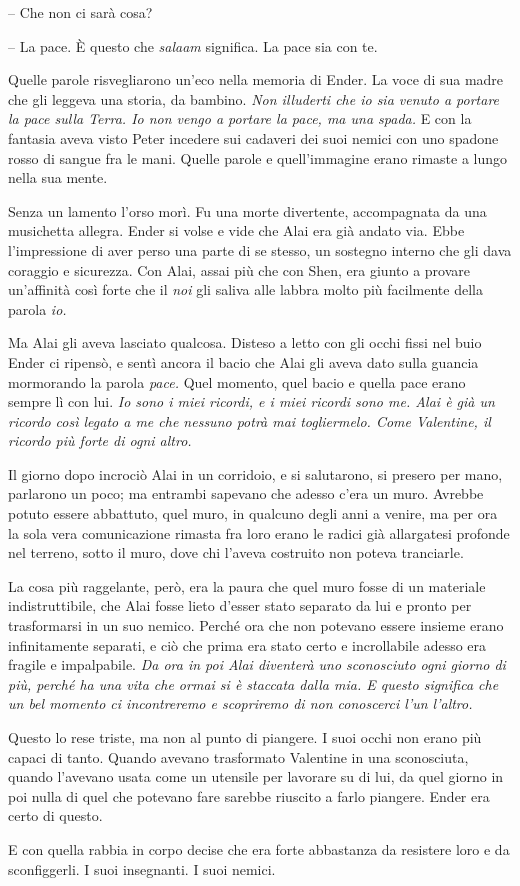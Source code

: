 {-- Che non ci sarà cosa?}

{-- La pace. È questo che \emph{salaam} significa. La pace sia con te.}

{Quelle parole risvegliarono un'eco nella memoria di Ender. La voce di
	sua madre che gli leggeva una storia, da bambino. \emph{Non illuderti
		che io sia venuto a portare la pace sulla Terra. Io non vengo a portare
		la pace, ma una spada.} E con la fantasia aveva visto Peter incedere sui
	cadaveri dei suoi nemici con uno spadone rosso di sangue fra le mani.
	Quelle parole e quell'immagine erano rimaste a lungo nella sua mente.}

{Senza un lamento l'orso morì. Fu una morte divertente, accompagnata da
	una musichetta allegra. Ender si volse e vide che Alai era già andato
	via. Ebbe l'impressione di aver perso una parte di se stesso, un
	sostegno interno che gli dava coraggio e sicurezza. Con Alai, assai più
	che con Shen, era giunto a provare un'affinità così forte che il
	\emph{noi} gli saliva alle labbra molto più facilmente della parola
	\emph{io.}}

{Ma Alai gli aveva lasciato qualcosa. Disteso a letto con gli occhi
	fissi nel buio Ender ci ripensò, e sentì ancora il bacio che Alai gli
	aveva dato sulla guancia mormorando la parola \emph{pace.} Quel momento,
	quel bacio e quella pace erano sempre lì con lui. \emph{Io sono i miei
		ricordi, e i miei ricordi sono me. Alai è già un ricordo così legato a
		me che nessuno potrà mai togliermelo. Come Valentine, il ricordo più
		forte di ogni altro.}}

{Il giorno dopo incrociò Alai in un corridoio, e si salutarono, si
	presero per mano, parlarono un poco; ma entrambi sapevano che adesso
	c'era un muro. Avrebbe potuto essere abbattuto, quel muro, in qualcuno
	degli anni a venire, ma per ora la sola vera comunicazione rimasta fra
	loro erano le radici già allargatesi profonde nel terreno, sotto il
	muro, dove chi l'aveva costruito non poteva tranciarle.}

{La cosa più raggelante, però, era la paura che quel muro fosse di un
	materiale indistruttibile, che Alai fosse lieto d'esser stato separato
	da lui e pronto per trasformarsi in un suo nemico. Perché ora che non
	potevano essere insieme erano infinitamente separati, e ciò che prima
	era stato certo e incrollabile adesso era fragile e impalpabile.
	\emph{Da ora in poi Alai diventerà uno sconosciuto ogni giorno di più,
		perché ha una vita che ormai si è staccata dalla mia. E questo significa
		che un bel momento ci incontreremo e scopriremo di non conoscerci l'un
		l'altro.}}

{Questo lo rese triste, ma non al punto di piangere. I suoi occhi non
	erano più capaci di tanto. Quando avevano trasformato Valentine in una
	sconosciuta, quando l'avevano usata come un utensile per lavorare su di
	lui, da quel giorno in poi nulla di quel che potevano fare sarebbe
	riuscito a farlo piangere. Ender era certo di questo.}

{E con quella rabbia in corpo decise che era forte abbastanza da
	resistere loro e da sconfiggerli. I suoi insegnanti. I suoi nemici.}

\label{Orsonux20Scottux20Cardux20-ux20Ilux20Giocoux20Diux20Enderux20-ux20BY_SLY70A1_split_013.htm}{}

